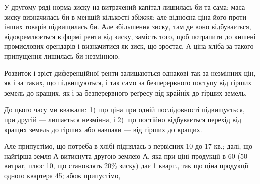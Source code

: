 У другому ряді норма зиску на витрачений капітал лишилась би та
сама; маса зиску визначилась би в меншій кількості збіжжя; але відносна ціна
його проти інших товарів підвищилась би. Але збільшення зиску, там де воно
відбувається, відокремлюється в формі ренти від зиску, замість того, щоб потрапити
до кишені промислових орендарів і визначитися як зиск, що зростає.
А ціна хліба за такого припущення лишилась би незмінною.

Розвиток і зріст диференційної ренти залишаються однакові так за незмінних
цін, як і за таких, що підвищуються, і так само за безперервного поступу
від гірших земель до кращих, як і за безперервного реґресу від крайніх
до гірших земель.

До цього часу ми вважали: 1)~що ціна при одній послідовності підвищується,
при другій — лишається незмінна, і 2)~що постійно відбувається перехід
від кращих земель до гірших або навпаки — від гірших до кращих.

Але припустімо, що потреба в хлібі піднялась з первісних 10 до 17 кв.;
далі, що найгірша земля $А$ витиснута другою землею $А$, яка при ціні продукції
в 60 (50 витрат, плюс 10, що становлять 20\% зиску) дає
1 кварт., так що ціна продукції одного квартера \deq{} 45; абож припустімо,
\parbreak{}  %
